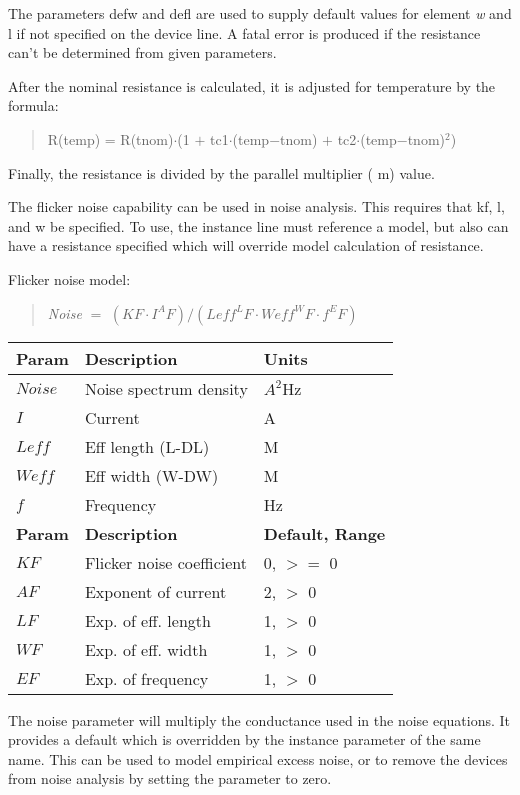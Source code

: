 The parameters {\vt defw} and {\vt defl} are used to supply default
values for element {\it w} and {\vt l} if not specified on the device
line.  A fatal error is produced if the resistance can't be determined
from given parameters.

After the nominal resistance is calculated, it is adjusted for
temperature by the formula:
\begin{quote}
R{\vt (temp)} = R{\vt (tnom)}$\cdot${\vt (1 $+$ tc1$\cdot$(temp$-$tnom) $+$
 tc2$\cdot$(temp$-$tnom)$^2$)}
\end{quote}

Finally, the resistance is divided by the parallel multiplier ({\vt
m}) value.

The flicker noise capability can be used in noise analysis.  This
requires that {\vt kf}, {\vt l}, and {\vt w} be specified.  To use,
the instance line must reference a model, but also can have a
resistance specified which will override model calculation of
resistance.

Flicker noise model:
\begin{quote}
    {\it Noise} $=$ $(KF \cdot I^AF) / (Leff^LF \cdot Weff^WF \cdot f^EF)$
\end{quote}

\begin{tabular}{|l|l|l|}\hline

\bf Param & \bf Description & \bf Units\\ \hline
$Noise$ & Noise spectrum density & $A^2$Hz\\ \hline
$I$ &    Current           &  A\\ \hline
$Leff$ & Eff length (L-DL) &  M\\ \hline
$Weff$ & Eff width  (W-DW) &  M\\ \hline
$f$ &    Frequency         &  Hz\\ \hline
\bf Param & \bf Description & \bf Default, Range\\ \hline
$KF$ &   Flicker noise coefficient & 0,  $>=$ 0\\ \hline
$AF$ &   Exponent of current & 2,  $>$ 0\\ \hline
$LF$ &   Exp. of eff. length & 1,  $>$ 0\\ \hline
$WF$ &   Exp. of eff. width & 1,  $>$ 0\\ \hline
$EF$ &   Exp. of frequency & 1,  $>$ 0\\ \hline
\end{tabular}

The {\vt noise} parameter will multiply the conductance used in the
noise equations.  It provides a default which is overridden by the
instance parameter of the same name.  This can be used to model
empirical excess noise, or to remove the devices from noise analysis
by setting the parameter to zero.


